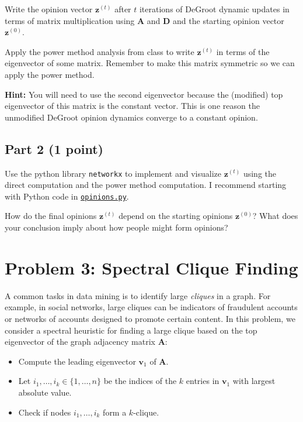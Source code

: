 \documentclass{article}
\begin{document}
Write the opinion vector $\mathbf{z}^{(t)}$ after $t$ iterations of DeGroot dynamic updates in terms of matrix multiplication using $\mathbf{A}$ and $\mathbf{D}$ and the starting opinion vector $\mathbf{z}^{(0)}$.

Apply the power method analysis from class to write $\mathbf{z}^{(t)}$ in terms of the eigenvector of some matrix. Remember to make this matrix symmetric so we can apply the power method.

\textbf{Hint:} You will need to use the second eigenvector because the (modified) top eigenvector of this matrix is the constant vector. This is one reason the unmodified DeGroot opinion dynamics converge to a constant opinion.

\subsection*{Part 2 (1 point)}

Use the python library \texttt{networkx} to implement and visualize $\mathbf{z}^{(t)}$ using the direct computation and the power method computation. I recommend starting with Python code in \href{https://www.rtealwitter.com/rads2024/psets/opinions.py}{\texttt{opinions.py}}.

How do the final opinions $\mathbf{z}^{(t)}$ depend on the starting opinions $\mathbf{z}^{(0)}$? What does your conclusion imply about how people might form opinions?

%

\newpage

\section*{Problem 3: Spectral Clique Finding}
A common tasks in data mining is to identify large \emph{cliques} in a graph. For example, in social networks, large cliques can be indicators of fraudulent accounts or networks of accounts designed to promote certain content. In this problem, we consider a spectral heuristic for finding a large clique based on the top eigenvector of the graph adjacency matrix $\mathbf{A}$: 
\begin{itemize}
	\item Compute the leading eigenvector $\mathbf{v}_1$ of $\mathbf{A}$. 
	\item Let $i_1, \ldots, i_k \in \{1, \ldots, n\}$ be the indices of the $k$ entries in $\mathbf{v}_1$ with largest absolute value. 
	\item Check if nodes $i_1, \ldots, i_k$ form a $k$-clique.
\end{itemize}
\end{document}
